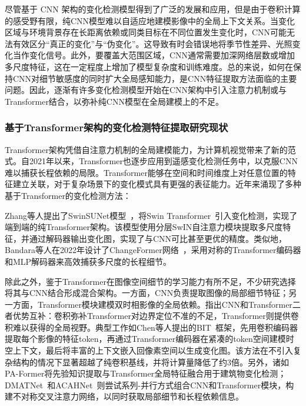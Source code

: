 尽管基于 CNN 架构的变化检测模型得到了广泛的发展和应用，但是由于卷积计算的感受野有限，纯CNN模型难以自适应地建模影像中的全局上下文关系。当变化区域与环境背景存在长距离依赖或同类目标在不同位置发生变化时，CNN可能无法有效区分“真正的变化”与“伪变化”。这导致有时会错误地将季节性差异、光照变化当作变化信号。此外，要覆盖大范围区域，CNN通常需要加深网络层数或增加多尺度特征，这在一定程度上增加了模型复杂度和训练难度。总的来说，如何在保持CNN对细节敏感度的同时扩大全局感知能力，是CNN特征提取方法面临的主要问题。因此，逐渐有许多变化检测模型开始在CNN架构中引入注意力机制或与Transformer结合，以弥补纯CNN模型在全局建模上的不足。

\subsubsection{基于Transformer架构的变化检测特征提取研究现状}

Transformer架构凭借自注意力机制的全局建模能力，为计算机视觉带来了新的范式。自2021年以来，Transformer也逐步应用到遥感变化检测任务中，以克服CNN难以捕获长程依赖的局限。Transformer能够在空间和时间维度上对任意位置的特征建立关联，对于复杂场景下的变化模式具有更强的表征能力。近年来涌现了多种基于Transformer的变化检测方法：

Zhang等人提出了SwinSUNet模型~\cite{zhang_swinsunet_2022}，将Swin Transformer~\cite{Liu2021SwinTH}引入变化检测，实现了端到端的纯Transformer架构。该模型使用分层SwIN自注意力模块提取多尺度特征，并通过解码器输出变化图，实现了与CNN可比甚至更优的精度。类似地，Bandara等人在2022年设计了ChangeFormer网络~\cite{bandara2022transformer}，采用对称的Transformer编码器和MLP解码器来高效捕获多尺度的长程细节。

除此之外，鉴于Transformer在图像空间细节的学习能力有所不足，不少研究选择将其与CNN结合形成混合架构。一方面，CNN负责提取图像的局部细节特征；另一方面，Transformer模块建模双时相影像的全局依赖。指出CNN和Transformer二者优势互补：卷积弥补Transformer对边界定位不准的不足，Transformer则提供卷积难以获得的全局视野。典型工作如Chen等人提出的BIT~\cite{chen_remote_2022}框架，先用卷积编码器提取每个影像的特征token，再通过Transformer编码器在紧凑的token空间建模时空上下文，最后将丰富的上下文嵌入回像素空间以生成变化图。该方法在不引入复杂结构的情况下显著超越了纯卷积基线，并将计算量降低了约3倍。另外，诸如PA-Former将先验知识提取与Transformer全局特征融合用于建筑物变化检测；DMATNet~\cite{Song2022RemoteSI}和ACAHNet~\cite{Zhang2023AsymmetricCH}则尝试系列-并行方式组合CNN和Transformer模块，构建不对称交叉注意力网络，以同时获取局部细节和长程依赖信息。

